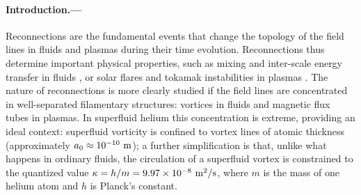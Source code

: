 \documentclass[
  reprint,
superscriptaddress,
 amsmath,amssymb,
 aps,
prb,
]{revtex4-2}
\begin{document}
\paragraph*{Introduction.---} Reconnections are the fundamental events that
change the topology of the field lines in fluids and plasmas during their time evolution. Reconnections thus determine important physical properties, such as mixing and inter-scale energy transfer in fluids \cite{YaoHussainAnnRev2022}, or solar flares and tokamak instabilities in plasmas \cite{Chapman2010}. The nature of reconnections is more clearly studied if the field lines are concentrated in well-separated filamentary structures: vortices in fluids and magnetic flux tubes in plasmas. In superfluid helium this concentration is extreme, providing an ideal context: superfluid vorticity is confined to vortex lines of atomic thickness (approximately $a_0 \approx 10^{-10}~\rm m$); a further simplification 
is that, unlike what happens in ordinary fluids, the
circulation of a superfluid vortex  is constrained to the quantized value $\kappa=h/m=9.97 \times 10^{-8}~\rm m^2/s$, 
where $m$ is the mass of one helium atom and $h$ is Planck's constant. 
\end{document}
